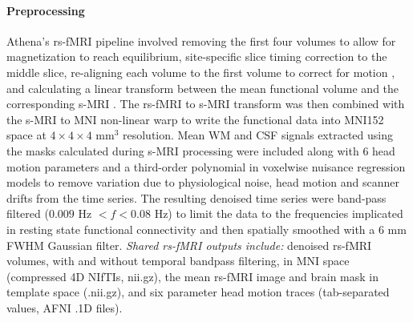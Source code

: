 \documentclass[preprint,12pt,3p]{elsarticle}
\begin{document}
\paragraph{Preprocessing}Athena's rs-fMRI pipeline involved removing the first four volumes to allow for magnetization to reach equilibrium, site-specific slice timing correction to the middle slice, re-aligning each volume to the first volume to correct for motion \cite{cox1999_motion}, and calculating a linear transform between the mean functional volume and the corresponding s-MRI \cite{jenkinson2002_flirt}. The rs-fMRI to s-MRI transform was then combined with the s-MRI to MNI non-linear warp to write the functional data into MNI152 space at $4\times4\times4$ mm$^3$ resolution. Mean WM and CSF signals extracted using the masks calculated during s-MRI processing were included along with 6 head motion parameters and a third-order polynomial in voxelwise nuisance regression models to remove variation due to physiological noise, head motion and scanner drifts from the time series\cite{lund2006_nvr,fox2005}. The resulting denoised time series were band-pass filtered ($0.009$ Hz $< f < 0.08$ Hz) to limit the data to the frequencies implicated in resting state functional connectivity \cite{biswal1995,cordes2001} and then spatially smoothed with a 6 mm FWHM Gaussian filter. \emph{Shared rs-fMRI outputs include:} denoised rs-fMRI volumes, with and without temporal bandpass filtering, in MNI space (compressed 4D NIfTIs, nii.gz), the mean rs-fMRI image and brain mask in template space (.nii.gz), and six parameter head motion traces (tab-separated values, AFNI .1D files). 
\end{document}
